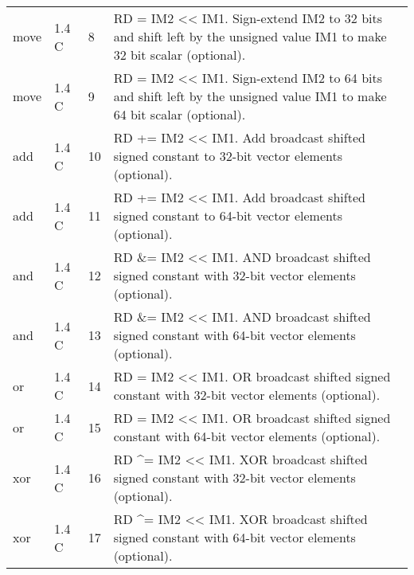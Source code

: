 \documentclass[forwardcom.tex]{subfiles}
\begin{document}
\begin{longtable} {|p{25mm}|p{14mm}|p{10mm}|p{95mm}|}
move          & 1.4 C &  8 & RD = IM2 \textless\textless{} IM1. Sign-extend IM2 to 32 bits and shift left by the unsigned value IM1 to make 32 bit scalar (optional). \\
move          & 1.4 C &  9 & RD = IM2 \textless\textless{} IM1. Sign-extend IM2 to 64 bits and shift left by the unsigned value IM1 to make 64 bit scalar (optional). \\
add           & 1.4 C & 10 & RD += IM2 \textless\textless{} IM1. Add broadcast shifted signed constant to 32-bit vector elements (optional). \\
add           & 1.4 C & 11 & RD += IM2 \textless\textless{} IM1. Add broadcast shifted signed constant to 64-bit vector elements (optional). \\
and           & 1.4 C & 12 & RD \&= IM2 \textless\textless{} IM1. AND broadcast shifted signed constant with 32-bit vector elements (optional). \\
and           & 1.4 C & 13 & RD \&= IM2 \textless\textless{} IM1. AND broadcast shifted signed constant with 64-bit vector elements (optional). \\
or            & 1.4 C & 14 & RD \textbar{}= IM2 \textless\textless{} IM1. OR broadcast shifted signed constant with 32-bit vector elements (optional). \\
or            & 1.4 C & 15 & RD \textbar{}= IM2 \textless\textless{} IM1. OR broadcast shifted signed constant with 64-bit vector elements (optional). \\
xor           & 1.4 C & 16 & RD \^{}= IM2 \textless\textless{} IM1. XOR broadcast shifted signed constant with 32-bit vector elements (optional). \\
xor           & 1.4 C & 17 & RD \^{}= IM2 \textless\textless{} IM1. XOR broadcast shifted signed constant with 64-bit vector elements (optional). \\


\end{longtable}
\end{document}
